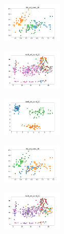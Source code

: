 \begin{figure}[H]
\begin{subfigure}
    \end{subfigure}
    \hfill
    \begin{subfigure}
        \centering
        \includegraphics[width=0.32\textwidth]{img/copkm/iris_set_const_10_49258669_clust.png}
    \end{subfigure}
    \hfill
    \begin{subfigure}
        \centering
        \includegraphics[width=0.32\textwidth]{img/copkm/ecoli_set_const_10_49258669_clust.png}
    \end{subfigure}
    \hfill
    \begin{subfigure}
        \centering
        \includegraphics[width=0.32\textwidth]{img/copkm/rand_set_const_10_49258669_clust.png}
    \end{subfigure}
    \hfill
    \begin{subfigure}
        \centering
        \includegraphics[width=0.32\textwidth]{img/copkm/iris_set_const_10_3773969821_clust.png}
    \end{subfigure}
    \hfill
    \begin{subfigure}
        \centering
        \includegraphics[width=0.32\textwidth]{img/copkm/ecoli_set_const_10_3773969821_clust.png}

\end{subfigure}
\end{figure}

